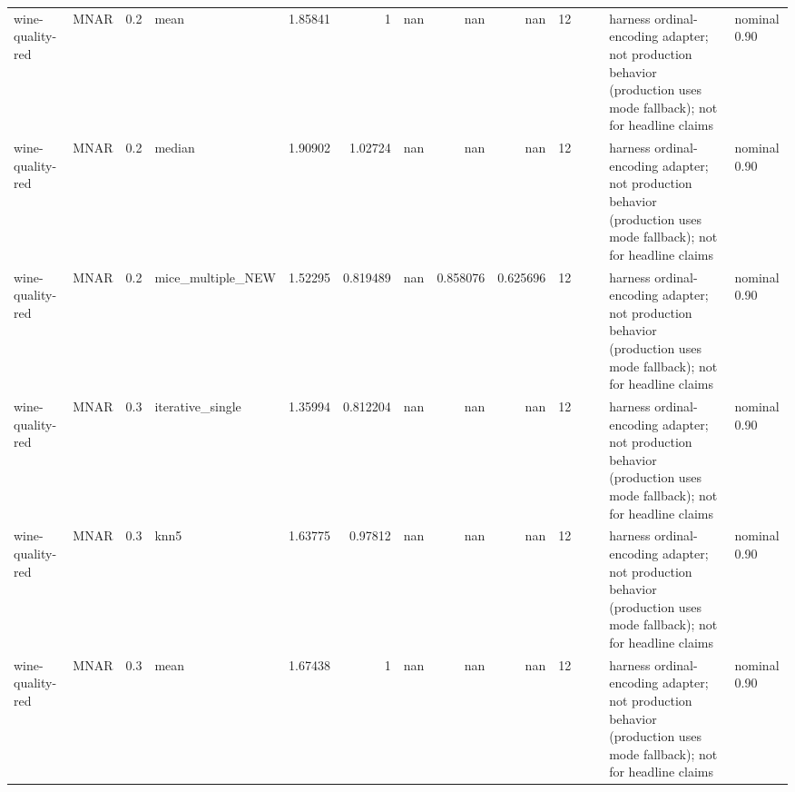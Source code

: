 \begin{table}[ht]
\begin{tabular}{llrlrrrrrrllll}
 wine-quality-red     & MNAR        &         0.2 & mean              &       1.85841  &             1        &               nan        &                     nan        &                       nan        &        12 &                    &                                         & harness ordinal-encoding adapter; not production behavior (production uses mode fallback); not for headline claims & nominal 0.90              \\
 wine-quality-red     & MNAR        &         0.2 & median            &       1.90902  &             1.02724  &               nan        &                     nan        &                       nan        &        12 &                    &                                         & harness ordinal-encoding adapter; not production behavior (production uses mode fallback); not for headline claims & nominal 0.90              \\
 wine-quality-red     & MNAR        &         0.2 & mice\_multiple\_NEW &       1.52295  &             0.819489 &               nan        &                       0.858076 &                         0.625696 &        12 &                    &                                         & harness ordinal-encoding adapter; not production behavior (production uses mode fallback); not for headline claims & nominal 0.90              \\
 wine-quality-red     & MNAR        &         0.3 & iterative\_single  &       1.35994  &             0.812204 &               nan        &                     nan        &                       nan        &        12 &                    &                                         & harness ordinal-encoding adapter; not production behavior (production uses mode fallback); not for headline claims & nominal 0.90              \\
 wine-quality-red     & MNAR        &         0.3 & knn5              &       1.63775  &             0.97812  &               nan        &                     nan        &                       nan        &        12 &                    &                                         & harness ordinal-encoding adapter; not production behavior (production uses mode fallback); not for headline claims & nominal 0.90              \\
 wine-quality-red     & MNAR        &         0.3 & mean              &       1.67438  &             1        &               nan        &                     nan        &                       nan        &        12 &                    &                                         & harness ordinal-encoding adapter; not production behavior (production uses mode fallback); not for headline claims & nominal 0.90              \\

\end{tabular}
\end{table}
